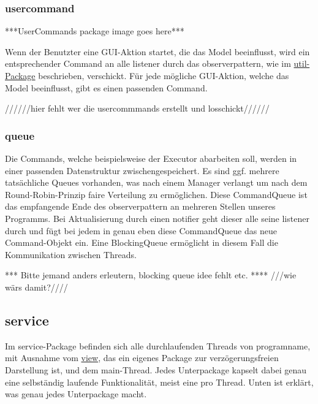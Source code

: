       \subsubsection{usercommand}
      \label{subsubsec:usercommand}
      ***UserCommands package image goes here***
      \newline
      \newline

      Wenn der Benutzter eine GUI-Aktion startet, die das Model beeinflusst,
      wird ein entsprechender Command an alle \gls{listener} durch das \gls{observerpattern}, wie im
      \hyperref[subsec:util]{util-Package} beschrieben, verschickt. Für jede mögliche
      GUI-Aktion, welche das Model beeinflusst, gibt es einen passenden Command.
      
      //////hier fehlt wer die usercommmands erstellt und losschickt//////

      \subsubsection{queue}
      \label{subsubsec:queue}
      Die Commands, welche beispielsweise der Executor abarbeiten soll, werden in einer passenden Datenstruktur zwischengespeichert. Es
      sind ggf. mehrere tatsächliche Queues vorhanden, was nach einem Manager verlangt
      um nach dem Round-Robin-Prinzip faire Verteilung zu ermöglichen. Diese CommandQueue ist das empfangende Ende des \gls{observerpattern} an mehreren Stellen unseres Programms.
      Bei Aktualisierung durch einen \gls{notifier} geht dieser alle seine \gls{listener} durch und fügt bei jedem in genau eben diese CommandQueue das neue Command-Objekt ein.
      Eine BlockingQueue ermöglicht in diesem Fall die Kommunikation zwischen Threads.

      *** Bitte jemand anders erleutern, blocking queue idee fehlt etc. **** ///wie wärs damit?////


\subsection{service}
\label{subsec:service}

Im service-Package befinden sich alle durchlaufenden Threads von \gls{programname},
mit Ausnahme vom \hyperref[subsec:view]{view}, das ein eigenes Package zur verzögerungsfreien Darstellung ist, und dem
main-Thread. Jedes Unterpackage kapselt dabei genau eine selbständig laufende Funktionalität, meist eine pro Thread. Unten ist erklärt, was genau jedes Unterpackage macht.

